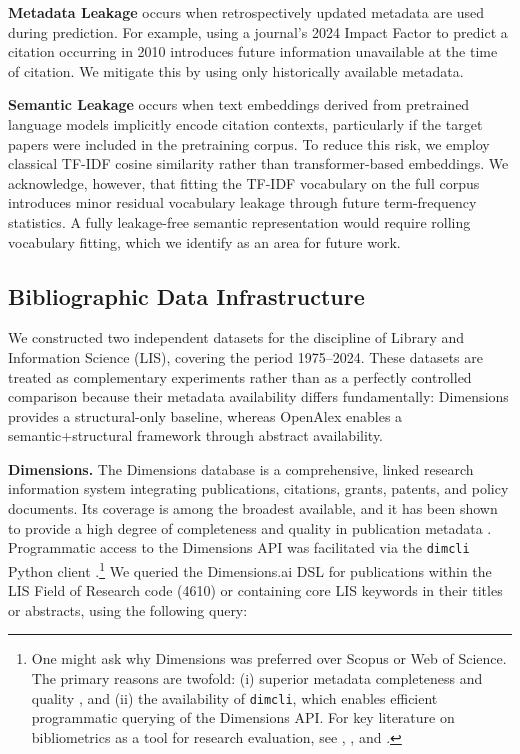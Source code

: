 \documentclass[11pt,a4paper]{article}
\begin{document}
\textbf{Metadata Leakage} occurs when retrospectively updated metadata are used during prediction. For example, using a journal's 2024 Impact Factor to predict a citation occurring in 2010 introduces future information unavailable at the time of citation. We mitigate this by using only historically available metadata.

\textbf{Semantic Leakage} occurs when text embeddings derived from pretrained language models implicitly encode citation contexts, particularly if the target papers were included in the pretraining corpus. To reduce this risk, we employ classical TF-IDF cosine similarity rather than transformer-based embeddings. We acknowledge, however, that fitting the TF-IDF vocabulary on the full corpus introduces minor residual vocabulary leakage through future term-frequency statistics. A fully leakage-free semantic representation would require rolling vocabulary fitting, which we identify as an area for future work.

\subsection{Bibliographic Data Infrastructure}

We constructed two independent datasets for the discipline of Library and Information Science (LIS), covering the period 1975--2024. These datasets are treated as complementary experiments rather than as a perfectly controlled comparison because their metadata availability differs fundamentally: Dimensions provides a structural-only baseline, whereas OpenAlex enables a semantic+structural framework through abstract availability.

\textbf{Dimensions.} The Dimensions database \citep{hook2018dimensions} is a comprehensive, linked research information system integrating publications, citations, grants, patents, and policy documents. Its coverage is among the broadest available, and it has been shown to provide a high degree of completeness and quality in publication metadata \citep{delgado2024completeness, nguyen2022quality}. Programmatic access to the Dimensions API was facilitated via the \texttt{dimcli} Python client \citep{dimcli2021}.\footnote{One might ask why Dimensions was preferred over Scopus or Web of Science. The primary reasons are twofold: (i) superior metadata completeness and quality \citep{delgado2024completeness, nguyen2022quality}, and (ii) the availability of \texttt{dimcli}, which enables efficient programmatic querying of the Dimensions API. For key literature on bibliometrics as a tool for research evaluation, see \citet{debellis2009bibliometrics}, \citet{hicks2012bibliometrics}, and \citet{bornmann2017measuring}.} We queried the Dimensions.ai DSL for publications within the LIS Field of Research code (4610) or containing core LIS keywords in their titles or abstracts, using the following query:
\end{document}
